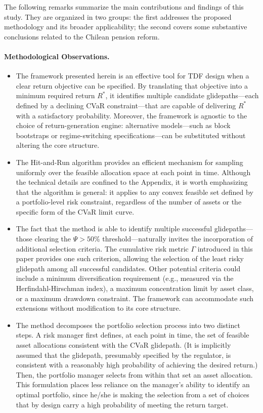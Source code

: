 \documentclass[11pt]{article}
\begin{document}
The following remarks summarize the main contributions and findings 
of this study. They are organized in two groups: the first addresses 
the proposed methodology and its broader applicability; the second 
covers some substantive conclusions related to  the Chilean pension reform.


\paragraph{Methodological Observations.}


\begin{itemize}
\item The framework presented herein is an effective tool for TDF design when a clear 
return objective can be specified. By translating that objective into 
a minimum required return $R^*$, it identifies multiple candidate 
glidepaths---each defined by a declining CVaR constraint---that are 
capable of delivering $R^*$ with a satisfactory probability. Moreover, 
the framework is agnostic to the choice of return-generation engine: 
alternative models---such as block bootstraps or regime-switching 
specifications---can be substituted without altering the core 
structure.

\item The Hit-and-Run algorithm provides an efficient 
mechanism for sampling uniformly over the feasible allocation space 
at each point in time. Although the technical details are confined 
to the Appendix, it is worth emphasizing that the algorithm is 
general: it applies to any convex feasible set defined by a 
portfolio-level risk constraint, regardless of the number of assets 
or the specific form of the CVaR limit curve.

\item The fact that the method is able to identify multiple successful 
glidepaths---those clearing the $\Psi > 50\%$ threshold---naturally 
invites the incorporation of additional selection criteria. The cumulative 
risk metric $\Gamma$ introduced in this paper provides one such criterion, 
allowing the selection of the least risky glidepath among all successful 
candidates. Other potential criteria could include a minimum diversification 
requirement (e.g., measured via the Herfindahl-Hirschman index), a maximum 
concentration limit by asset class, or a maximum drawdown constraint. 
The framework can accommodate such extensions without modification to 
its core structure.


\item The method decomposes the portfolio selection  process into 
two distinct steps. A risk manager first defines, at each point in 
time, the set of feasible asset allocations consistent with the 
CVaR glidepath. (It is implicitly assumed that the glidepath, presumably specified by the regulator, is consistent with a reasonably  high probability of achieving the desired return.)   Then,  the  portfolio manager  selects from within that 
set  an asset allocation. This formulation places less reliance on the manager's ability 
to identify an optimal portfolio, since he/she is making the selection from a set of choices that by design   carry a high probability of meeting the 
return target.


\end{itemize}
\end{document}
